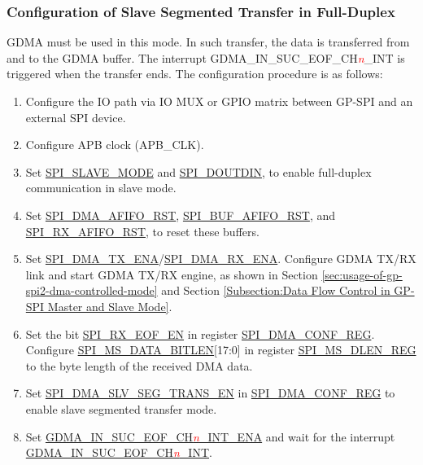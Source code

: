 \documentclass[main\_\_EN.tex]{subfiles}
\begin{document}
\subsubsection{Configuration of Slave Segmented Transfer in Full-Duplex}\label{sec:gp-spi2-slave-fd-seg-trans}
GDMA must be used in this mode. In such transfer, the data is transferred from and to the GDMA buffer. The interrupt GDMA\_IN\_SUC\_EOF\_CH\textcolor{red}{\it{n}}\_INT is triggered when the transfer ends. The configuration procedure is as follows:

\begin{enumerate}
   \item Configure the IO path via IO MUX or GPIO matrix between GP-SPI and an external SPI device.
   \item Configure APB clock (APB\_CLK).

    \item Set \hyperref[fielddesc:SPISLAVEMODE]{SPI\_SLAVE\_MODE} and \hyperref[fielddesc:SPIDOUTDIN]{SPI\_DOUTDIN}, to enable full-duplex communication in slave mode.

    \item Set \hyperref[fielddesc:SPIDMAAFIFORST]{SPI\_DMA\_AFIFO\_RST}, \hyperref[fielddesc:SPIBUFAFIFORST]{SPI\_BUF\_AFIFO\_RST}, and \hyperref[fielddesc:SPIRXAFIFORST]{SPI\_RX\_AFIFO\_RST}, to reset these buffers.

    \item Set \hyperref[fielddesc:SPIDMATXENA]{SPI\_DMA\_TX\_ENA}/\hyperref[fielddesc:SPIDMARXENA]{SPI\_DMA\_RX\_ENA}. Configure GDMA TX/RX link and start GDMA TX/RX engine, as shown in Section \ref{sec:usage-of-gp-spi2-dma-controlled-mode} and Section \ref{Subsection:Data Flow Control in GP-SPI Master and Slave Mode}.

    \item Set the bit \hyperref[fielddesc:SPIRXEOFEN]{SPI\_RX\_EOF\_EN} in register \hyperref[regdesc:SPIDMACONFREG]{SPI\_DMA\_CONF\_REG}. Configure \hyperref[fielddesc:SPIMSDATABITLEN]{SPI\_MS\_DATA\_BITLEN}[17:0] in register \hyperref[regdesc:SPIMSDLENREG]{SPI\_MS\_DLEN\_REG} to the byte length of the received DMA data.

    \item Set \hyperref[fielddesc:SPIDMASLVSEGTRANSEN]{SPI\_DMA\_SLV\_SEG\_TRANS\_EN} in \hyperref[regdesc:SPIDMACONFREG]{SPI\_DMA\_CONF\_REG} to enable slave segmented transfer mode.

    \item Set \hyperref[fielddesc:DMAINSUCEOFCHNINTENA]{GDMA\_IN\_SUC\_EOF\_CH\textcolor{red}{\it{n}}\_INT\_ENA} and wait for the interrupt \hyperref[int:GDMAINSUCEOFINT]{GDMA\_IN\_SUC\_EOF\_CH\textcolor{red}{\it{n}}\_INT}.
\end{enumerate}
\end{document}
